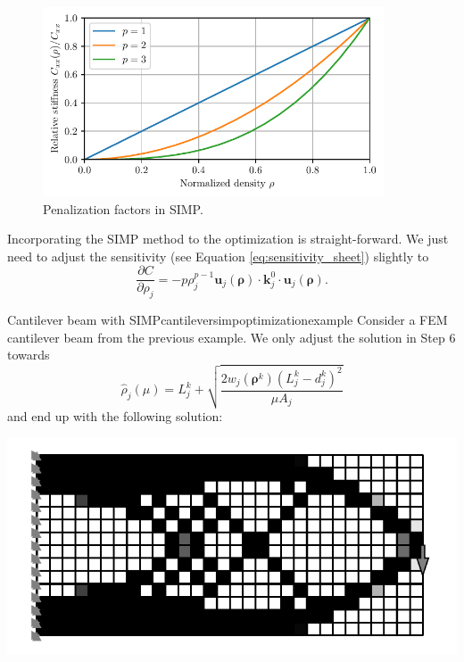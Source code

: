 \begin{figure}[!htpb]
    \centering
    \includegraphics[width=0.9\textwidth]{figures/simp.pdf}
    \caption{Penalization factors in SIMP.}
    \label{fig:simp}
\end{figure}

Incorporating the SIMP method to the optimization is straight-forward. We just need to adjust the sensitivity (see Equation \ref{eq:sensitivity_sheet}) slightly to
\begin{equation}
    \frac{\partial C}{\partial \rho_j} = - p \rho_j^{p-1} \mathbf{u}_j(\pmb{\rho})  \cdot \mathbf{k}^0_j \cdot \mathbf{u}_j(\pmb{\rho}).
    \label{eq:sensitivity_topology}
\end{equation}

\begin{example}{Cantilever beam with SIMP}{cantileversimpoptimizationexample}
    Consider a FEM cantilever beam from the previous example. We only adjust the solution in Step 6 towards 
    \begin{equation}
        \hat{\rho}_j(\mu) = L_j^k + \sqrt{\frac{2 w_j (\pmb{\rho}^k)
        (L^k_j-d^k_j)^2}{\mu A_j}}
    \end{equation}
    and end up with the following solution:

    \begin{center}
        \includegraphics[width=\linewidth]{figures/cantilever_fem_optimized_binary.pdf}
    \end{center}
\end{example}

